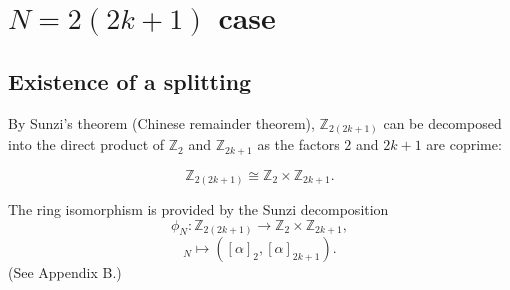 \documentclass[12pt]{iopart}
\newcommand{\sbt}{\,\begin{picture}(-1,1)(-1,-3)\circle*{2}\end{picture}\ }
\begin{document}
%
%
%
%

\section{\(N=2(2k+1)\) case}
\subsection{Existence of a splitting}
By Sunzi's theorem (Chinese remainder theorem), \(\mathbb Z_{2(2k+1)}\) can be decomposed
into the direct product of \(\mathbb Z_2\) and \(\mathbb Z_{2k+1}\)
as the factors \(2\)  and \(2k+1\) are coprime:

\begin{equation}
\mathbb Z_{2(2k+1)}\cong\mathbb Z_2\times\mathbb Z_{2k+1}.
\end{equation}

The ring isomorphism is provided by the Sunzi decomposition
\begin{equation}
\phi_N: \mathbb Z_{2(2k+1)}\rightarrow\mathbb Z_2\times\mathbb Z_{2k+1},
\end{equation}
\begin{equation}
[\alpha]_N\mapsto ([\alpha]_2,[\alpha]_{2k+1}).
\end{equation}
(See Appendix B.)
\end{document}
